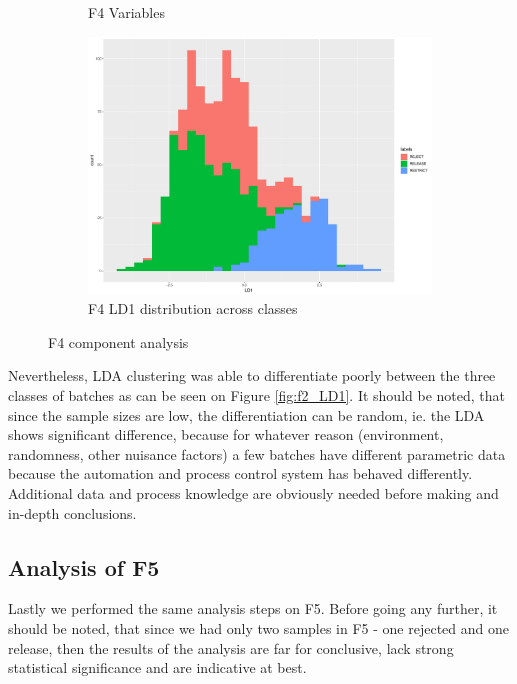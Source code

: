 \begin{figure}[ht!]
\begin{subfigure}{0.3\textwidth}
\begin{center}
        \end{center}
        \caption{F4 Variables}
        \label{fig:f4_variables}
    \end{subfigure}%
    \begin{subfigure}{0.3\textwidth}
        \begin{center}
        \includegraphics[width=\textwidth]{plots/f4_LD1.pdf}
        \end{center}
        \caption{F4 LD1 distribution across classes}
        \label{fig:f4_LD1}
    \end{subfigure}
    \caption{F4 component analysis}
\end{figure}

Nevertheless, LDA clustering was able to differentiate poorly between the three classes of batches as can be seen on Figure \ref{fig:f2_LD1}. It should be noted, that since the sample sizes are low, the differentiation can be random, ie. the LDA shows significant difference, because for whatever reason (environment, randomness, other nuisance factors) a few batches have different parametric data because the automation and process control system has behaved differently. Additional data and process knowledge are obviously needed before making and in-depth conclusions.

\clearpage
\subsection{Analysis of F5}
Lastly we performed the same analysis steps on F5. Before going any further, it should be noted, that since we had only two samples in F5 - one rejected and one release, then the results of the analysis are far for conclusive, lack strong statistical significance and are indicative at best. 

